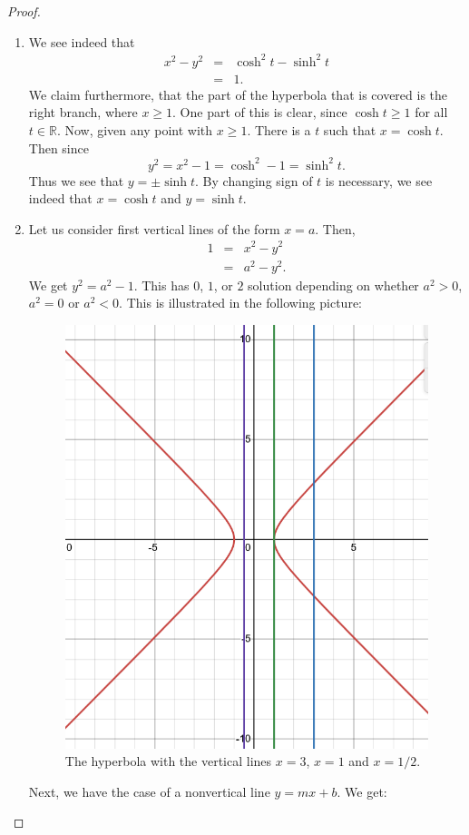 \begin{proof}
    \begin{enumerate}
        \item We see indeed that
        \begin{eqnarray*}
            x^2 - y^2
            & = & \cosh^2 t - \sinh^2 t\\
            & = & 1.
        \end{eqnarray*}
        We claim furthermore, that the part of the hyperbola that is covered is the right branch, where $x\geq 1$. One part of this is clear, since $\cosh t\geq 1$ for all $t\in \mathbb{R}$. Now, given any point with $x\geq 1$. There is a $t$ such that $x=\cosh t$. Then since
        $$y^2 = x^2 - 1 = \cosh^2 - 1 = \sinh^2 t.$$
        Thus we see that $y = \pm \sinh t$. By changing sign of $t$ is necessary, we see indeed that $x=\cosh t$ and $y = \sinh t$.
        \item Let us consider first vertical lines of the form $x=a$. Then,
        \begin{eqnarray*}
            1
            & = & x^2 - y^2\\
            & = & a^2 - y^2.
        \end{eqnarray*}
        We get $y^2 = a^2 - 1$. This has $0$, $1$, or $2$ solution depending on whether $a^2 > 0$, $a^2 = 0$ or $a^2 < 0$. This is illustrated in the following picture:
        \begin{figure}[H]
            \centering
            \includegraphics[width=0.5\linewidth]{cox-little-oshea/ch1/assets/sec1-3-ex5b.png}
            \caption{The hyperbola with the vertical lines $x=3$, $x=1$ and $x=1/2$.}
            \label{fig:sec1-3-ex5b}
        \end{figure}
        Next, we have the case of a nonvertical line $y=mx+b$. We get:

\end{enumerate}
\end{proof}
